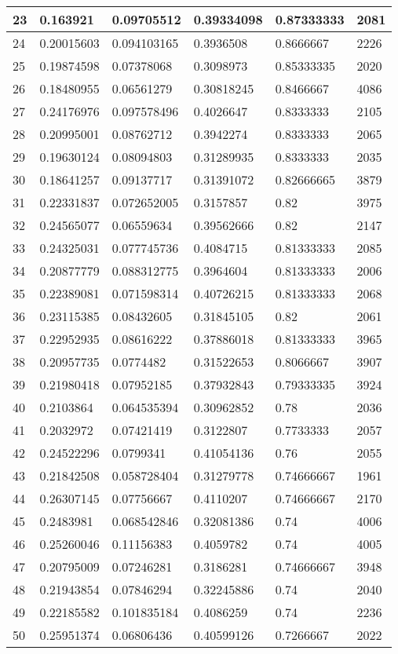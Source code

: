 \begin{longtable}{|l|l|l|l|l|l|}
23 & 0.163921 & 0.09705512 & 0.39334098 & 0.87333333 & 2081 \\ \hline 
24 & 0.20015603 & 0.094103165 & 0.3936508 & 0.8666667 & 2226 \\ \hline 
25 & 0.19874598 & 0.07378068 & 0.3098973 & 0.85333335 & 2020 \\ \hline 
26 & 0.18480955 & 0.06561279 & 0.30818245 & 0.8466667 & 4086 \\ \hline 
27 & 0.24176976 & 0.097578496 & 0.4026647 & 0.8333333 & 2105 \\ \hline 
28 & 0.20995001 & 0.08762712 & 0.3942274 & 0.8333333 & 2065 \\ \hline 
29 & 0.19630124 & 0.08094803 & 0.31289935 & 0.8333333 & 2035 \\ \hline 
30 & 0.18641257 & 0.09137717 & 0.31391072 & 0.82666665 & 3879 \\ \hline 
31 & 0.22331837 & 0.072652005 & 0.3157857 & 0.82 & 3975 \\ \hline 
32 & 0.24565077 & 0.06559634 & 0.39562666 & 0.82 & 2147 \\ \hline 
33 & 0.24325031 & 0.077745736 & 0.4084715 & 0.81333333 & 2085 \\ \hline 
34 & 0.20877779 & 0.088312775 & 0.3964604 & 0.81333333 & 2006 \\ \hline 
35 & 0.22389081 & 0.071598314 & 0.40726215 & 0.81333333 & 2068 \\ \hline 
36 & 0.23115385 & 0.08432605 & 0.31845105 & 0.82 & 2061 \\ \hline 
37 & 0.22952935 & 0.08616222 & 0.37886018 & 0.81333333 & 3965 \\ \hline 
38 & 0.20957735 & 0.0774482 & 0.31522653 & 0.8066667 & 3907 \\ \hline 
39 & 0.21980418 & 0.07952185 & 0.37932843 & 0.79333335 & 3924 \\ \hline 
40 & 0.2103864 & 0.064535394 & 0.30962852 & 0.78 & 2036 \\ \hline 
41 & 0.2032972 & 0.07421419 & 0.3122807 & 0.7733333 & 2057 \\ \hline 
42 & 0.24522296 & 0.0799341 & 0.41054136 & 0.76 & 2055 \\ \hline 
43 & 0.21842508 & 0.058728404 & 0.31279778 & 0.74666667 & 1961 \\ \hline 
44 & 0.26307145 & 0.07756667 & 0.4110207 & 0.74666667 & 2170 \\ \hline 
45 & 0.2483981 & 0.068542846 & 0.32081386 & 0.74 & 4006 \\ \hline 
46 & 0.25260046 & 0.11156383 & 0.4059782 & 0.74 & 4005 \\ \hline 
47 & 0.20795009 & 0.07246281 & 0.3186281 & 0.74666667 & 3948 \\ \hline 
48 & 0.21943854 & 0.07846294 & 0.32245886 & 0.74 & 2040 \\ \hline 
49 & 0.22185582 & 0.101835184 & 0.4086259 & 0.74 & 2236 \\ \hline 
50 & 0.25951374 & 0.06806436 & 0.40599126 & 0.7266667 & 2022 \\ \hline 
\end{longtable}